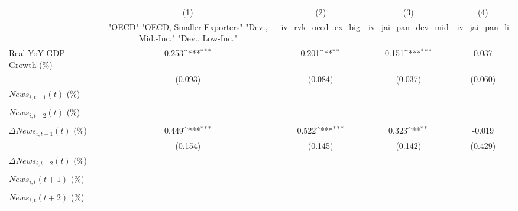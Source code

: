 {
\def\sym#1{\ifmmode^{#1}\else\(^{#1}\)\fi}
\begin{tabular}{l*{4}{c}}
\toprule
                    &\multicolumn{1}{c}{(1)}&\multicolumn{1}{c}{(2)}&\multicolumn{1}{c}{(3)}&\multicolumn{1}{c}{(4)}\\
                    &\multicolumn{1}{c}{ "OECD" "OECD, Smaller Exporters" "Dev., Mid.-Inc." "Dev., Low-Inc."}&\multicolumn{1}{c}{iv_rvk_oecd_ex_big}&\multicolumn{1}{c}{iv_jai_pan_dev_mid}&\multicolumn{1}{c}{iv_jai_pan_li}\\
\midrule
Real YoY GDP Growth (\%)&       0.253\sym{***}&       0.201\sym{**} &       0.151\sym{***}&       0.037         \\
                    &     (0.093)         &     (0.084)         &     (0.037)         &     (0.060)         \\
\addlinespace
$ News_{i,t-1}(t)$ (\%)&                     &                     &                     &                     \\
                    &                     &                     &                     &                     \\
\addlinespace
$ News_{i,t-2}(t)$ (\%)&                     &                     &                     &                     \\
                    &                     &                     &                     &                     \\
\addlinespace
$ \Delta News_{i,t-1}(t)$ (\%)&       0.449\sym{***}&       0.522\sym{***}&       0.323\sym{**} &      -0.019         \\
                    &     (0.154)         &     (0.145)         &     (0.142)         &     (0.429)         \\
\addlinespace
$ \Delta News_{i,t-2}(t)$ (\%)&                     &                     &                     &                     \\
                    &                     &                     &                     &                     \\
\addlinespace
$ News_{i,t}(t+1)$ (\%)&                     &                     &                     &                     \\
                    &                     &                     &                     &                     \\
\addlinespace
$ News_{i,t}(t+2)$ (\%)&                     &                     &                     &                     \\

\end{tabular}}

